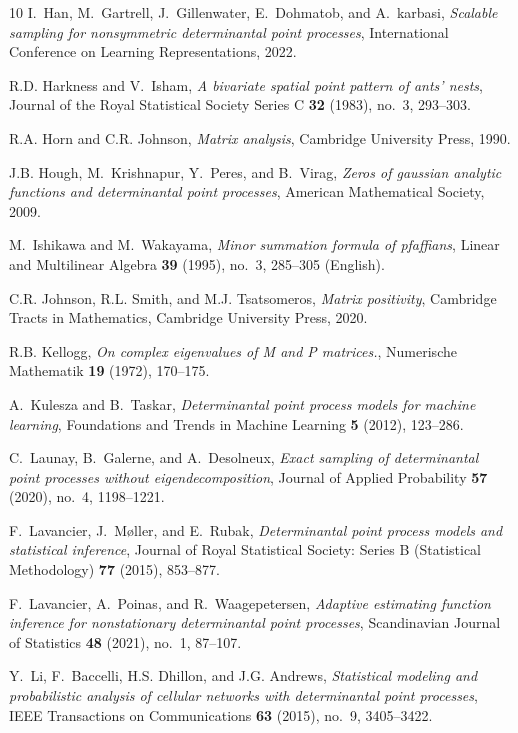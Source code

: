 \documentclass{article}
\numberwithin{equation}{section}
\theoremstyle{plain}
\begin{document}
\begin{thebibliography}{10}
I.~Han, M.~Gartrell, J.~Gillenwater, E.~Dohmatob, and A.~karbasi,
  \emph{Scalable sampling for nonsymmetric determinantal point processes},
  International Conference on Learning Representations, 2022.

R.D. Harkness and V.~Isham, \emph{A bivariate spatial point pattern of ants'
  nests}, Journal of the Royal Statistical Society Series C \textbf{32} (1983),
  no.~3, 293--303.

R.A. Horn and C.R. Johnson, \emph{Matrix analysis}, Cambridge University Press,
  1990.

J.B. Hough, M.~Krishnapur, Y.~Peres, and B.~Virag, \emph{Zeros of gaussian
  analytic functions and determinantal point processes}, American Mathematical
  Society, 2009.

M.~Ishikawa and M.~Wakayama, \emph{Minor summation formula of pfaffians},
  Linear and Multilinear Algebra \textbf{39} (1995), no.~3, 285--305 (English).

C.R. Johnson, R.L. Smith, and M.J. Tsatsomeros, \emph{Matrix positivity},
  Cambridge Tracts in Mathematics, Cambridge University Press, 2020.

R.B. Kellogg, \emph{On complex eigenvalues of {M} and {P} matrices.},
  Numerische Mathematik \textbf{19} (1972), 170--175.

A.~Kulesza and B.~Taskar, \emph{Determinantal point process models for machine
  learning}, Foundations and Trends in Machine Learning \textbf{5} (2012),
  123--286.

C.~Launay, B.~Galerne, and A.~Desolneux, \emph{Exact sampling of determinantal
  point processes without eigendecomposition}, Journal of Applied Probability
  \textbf{57} (2020), no.~4, 1198–1221.

F.~{Lavancier}, J.~{M{\o}ller}, and E.~{Rubak}, \emph{Determinantal point
  process models and statistical inference}, Journal of Royal Statistical
  Society: Series B (Statistical Methodology) \textbf{77} (2015), 853--877.

F.~Lavancier, A.~Poinas, and R.~Waagepetersen, \emph{Adaptive estimating
  function inference for nonstationary determinantal point processes},
  Scandinavian Journal of Statistics \textbf{48} (2021), no.~1, 87--107.

Y.~Li, F.~Baccelli, H.S. Dhillon, and J.G. Andrews, \emph{Statistical modeling
  and probabilistic analysis of cellular networks with determinantal point
  processes}, IEEE Transactions on Communications \textbf{63} (2015), no.~9,
  3405--3422.


\end{thebibliography}
\end{document}

